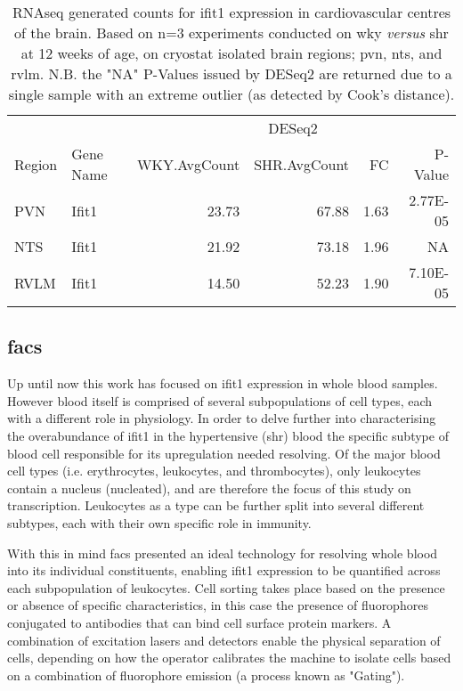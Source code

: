 \begin{table}[!htbp]
\centering
\small
\begin{tabular}{llrrrr}
       &           & \multicolumn{4}{c}{DESeq2}                           \\
Region & Gene Name & WKY.AvgCount & SHR.AvgCount & FC          & P-Value  \\
\hline
PVN    & Ifit1     & 23.73        & 67.88     & 1.63  & 2.77E-05 \\
NTS    & Ifit1     & 21.92        & 73.18     & 1.96  & NA       \\
RVLM   & Ifit1     & 14.50        & 52.23     & 1.90  & 7.10E-05
\end{tabular}
\caption[RNAseq generated counts for \acrshort{ifit1} expression in cardiovascular centres of the brain]{RNAseq generated counts for \acrshort{ifit1} expression in cardiovascular centres of the brain. Based on n=3 experiments conducted on \acrshort{wky} \textit{versus} \acrshort{shr} at 12 weeks of age, on cryostat isolated brain regions; \acrfull{pvn}, \acrfull{nts}, and \acrfull{rvlm}. N.B. the "NA" P-Values issued by DESeq2 are returned due to a single sample with an extreme outlier (as detected by Cook's distance).}
\label{fig:rnaseqifit1_brain}
\end{table}


\subsection{\acrfull{facs}}

Up until now this work has focused on \acrshort{ifit1} expression in whole blood samples. However blood itself is comprised of several subpopulations of cell types, each with a different role in physiology. In order to delve further into characterising the overabundance of \acrshort{ifit1} in the hypertensive (\acrshort{shr}) blood the specific subtype of blood cell responsible for its upregulation needed resolving. Of the major blood cell types (i.e. erythrocytes, leukocytes, and thrombocytes), only leukocytes contain a nucleus (nucleated), and are therefore the focus of this study on transcription. Leukocytes as a type can be further split into several different subtypes, each with their own specific role in immunity. 

With this in mind \acrfull{facs} presented an ideal technology for resolving whole blood into its individual constituents, enabling \acrshort{ifit1} expression to be quantified across each subpopulation of leukocytes. Cell sorting takes place based on the presence or absence of specific characteristics, in this case the presence of fluorophores conjugated to antibodies that can bind cell surface protein markers. A combination of excitation lasers and detectors enable the physical separation of cells, depending on how the operator calibrates the machine to isolate cells based on a combination of fluorophore emission (a process known as "Gating"). 

